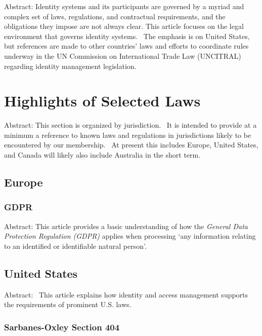 Abstract: Identity systems and its participants are governed by a myriad
and complex set of laws, regulations, and contractual requirements, and
the obligations they impose are not always clear. This article focuses
on the legal environment that governs identity systems.~ The emphasis is
on United States, but references are made to other countries' laws and
efforts to coordinate rules underway in the UN Commission on
International Trade Law (UNCITRAL) regarding identity management
legislation.

\hypertarget{highlights-of-selected-laws}{%
\section{Highlights of Selected
Laws}\label{highlights-of-selected-laws}}

Abstract: This section is organized by jurisdiction.~ It is intended to
provide at a minimum a reference to known laws and regulations in
jurisdictions likely to be encountered by our membership.~ At present
this includes Europe, United States, and Canada will likely also include
Australia in the short term.

\hypertarget{europe}{%
\subsection{Europe}\label{europe}}

\hypertarget{gdpr}{%
\subsubsection{GDPR}\label{gdpr}}

Abstract: This article provides a basic understanding of how the
\emph{General Data Protection Regulation (GDPR)} applies when processing
`any information relating to an identified or identifiable natural
person'.

\hypertarget{united-states}{%
\subsection{United States}\label{united-states}}

Abstract:~ This article explains how identity and access management
supports the requirements of prominent U.S. laws.

\hypertarget{sarbanes-oxley-section-404}{%
\subsubsection{Sarbanes-Oxley Section
404}\label{sarbanes-oxley-section-404}}

